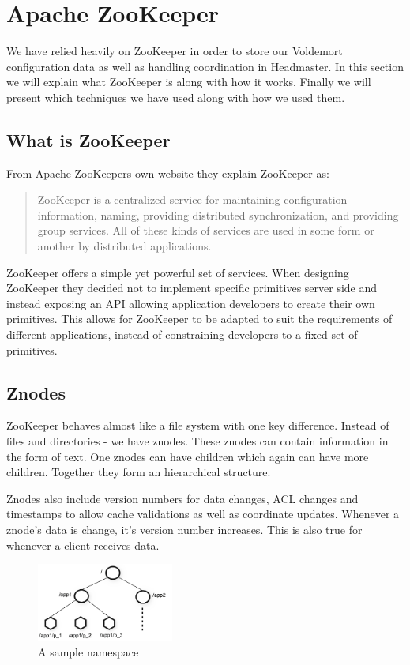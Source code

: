 \clearpage
\section{Apache ZooKeeper}
\label{sec:zookeeper}
We have relied heavily on ZooKeeper in order to store our Voldemort configuration data as well as handling coordination in Headmaster. In this section we will explain what ZooKeeper is along with how it works. Finally we will present which techniques we have used along with how we used them. 

\subsection{What is ZooKeeper}
From Apache ZooKeepers own website\cite{zookeeper} they explain ZooKeeper as:

\blockquote{ZooKeeper is a centralized service for maintaining configuration information, naming, providing distributed synchronization, and providing group services. All of these kinds of services are used in some form or another by distributed applications.}

ZooKeeper offers a simple yet powerful set of services. When designing ZooKeeper they decided not to implement specific primitives server side and instead exposing an API allowing application developers to create their own primitives. This allows for ZooKeeper to be adapted to suit the requirements of different applications, instead of constraining developers to a fixed set of primitives. 

\subsection{Znodes}
ZooKeeper behaves almost like a file system with one key difference. Instead of files and directories - we have znodes. These znodes can contain information in the form of text. One znodes can have children which again can have more children. Together they form an hierarchical structure. 

Znodes also include version numbers for data changes, ACL changes and timestamps to allow cache validations as well as coordinate updates. Whenever a znode's data is change, it's version number increases. This is also true for whenever a client receives data. 

\begin{figure}[h]
    \centering
    \includegraphics[width=0.4\textwidth]{software/zknamespace.jpg}
    \caption{A sample namespace}
    \label{fig:zk_namespace}
\end{figure}

